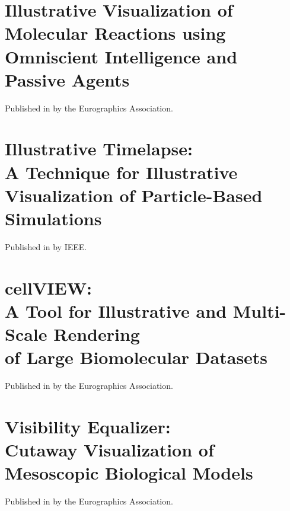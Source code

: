 \renewcommand\appendixname{Paper}
\appendix



\chapter{Illustrative Visualization of Molecular Reactions using Omniscient Intelligence and Passive Agents}

\begin{flushright}
	Published in \cite{le2014illustrative} by the Eurographics Association.
\end{flushright}




\chapter{Illustrative Timelapse: \\
	A Technique for Illustrative Visualization 	of Particle-Based Simulations}

\begin{flushright}
	Published in \cite{le2015illustrative} by IEEE.
\end{flushright}




\chapter{cellVIEW: \\
	A Tool for Illustrative and Multi-Scale Rendering \\
	of Large Biomolecular Datasets}

\begin{flushright}
	Published in \cite{le2015cellview} by the Eurographics Association.
\end{flushright}




\chapter{Visibility Equalizer: \\
	Cutaway Visualization of Mesoscopic Biological Models}

\begin{flushright}
	Published in \cite{le2016visibility} by the Eurographics Association.
\end{flushright}


